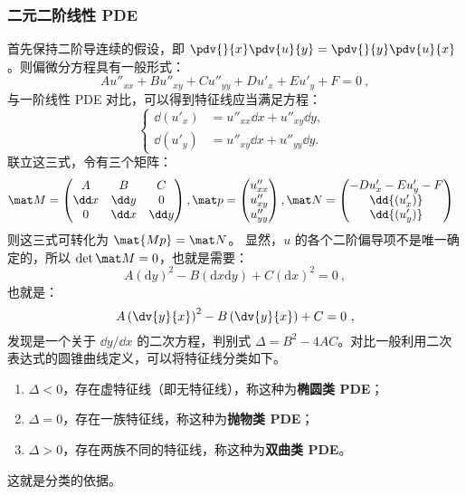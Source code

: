 \subsubsection{二元二阶线性 PDE}
首先保持二阶导连续的假设，即 $\pdv{}{x}\pdv{u}{y} = \pdv{}{y}\pdv{u}{x}$。则偏微分方程具有一般形式：
$$Au''_{xx} + Bu''_{xy} + Cu''_{yy} + Du'_{x} + Eu'_{y} + F = 0 ~,$$
与一阶线性 PDE 对比，可以得到特征线应当满足方程：
$$
\left\{
\begin{aligned}
\dd{(u'_{x})} &= u''_{xx} \dd x + u''_{xy} \dd y,\\
\dd{(u'_{y})} &= u''_{xy} \dd x + u''_{yy} \dd y.
\end{aligned}
\right. ~~$$
联立这三式，令有三个矩阵：
\begin{equation}
\mat M= 
\begin{pmatrix}
A & B & C \\
\dd x & \dd y & 0 \\
0 & \dd x & \dd y 
\end{pmatrix}, 
\mat p= 
\begin{pmatrix}
u''_{xx} \\
u''_{xy} \\
u''_{yy}
\end{pmatrix},
\mat N = 
\begin{pmatrix}
-D u'_{x} - E u'_{y} - F\\
\dd{(u'_{x})}\\
\dd{(u'_{y})}
\end{pmatrix}
~~
\end{equation}
则这三式可转化为 $\mat{Mp}=\mat N$。
显然，$u$ 的各个二阶偏导项不是唯一确定的，所以  $\det \mat M = 0$，也就是需要：
\begin{equation}
A\left(\mathrm{d} y\right)^2 - B\left(\mathrm{d} x \mathrm{d} y\right) + C\left(\mathrm{d} x\right)^2 =0
~,
\end{equation}
也就是：
\begin{equation}
A\left(\dv{y}{x}\right)^2 - B\left(\dv{y}{x}\right) + C = 0 ~,
\end{equation}
发现是一个关于 $\dd y/\dd x$ 的二次方程，判别式 $\Delta = B^2-4AC$。对比一般利用二次表达式的圆锥曲线定义，可以将特征线分类如下。
\begin{enumerate}
\item $\Delta < 0$，存在虚特征线（即无特征线），称这种为\textbf{椭圆类 PDE}；
\item $\Delta = 0$，存在一族特征线，称这种为\textbf{抛物类 PDE}；
\item $\Delta > 0$，存在两族不同的特征线，称这种为\textbf{双曲类 PDE}。
\end{enumerate}
这就是分类的依据。

